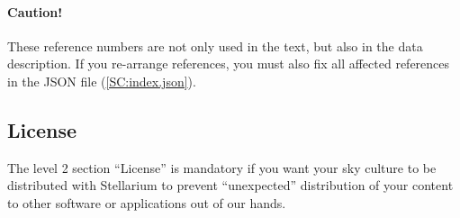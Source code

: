 \paragraph{Caution!} These reference numbers are not only used in the text, but also in the data description. If you re-arrange references, 
you must also fix all affected references in the JSON file (\ref{SC:index.json}).


\subsection{License}
\label{sec:skycultures:licenses}
\label{SC:license}

The level 2 section ``License''  is mandatory if you want your sky culture to be distributed with
Stellarium to prevent ``unexpected'' distribution of your content to other
software or applications out of our hands.  
\iffalse
The license info will be decoded for human readable hints about allowed permissions for sky culture in the GUI.
\fi

